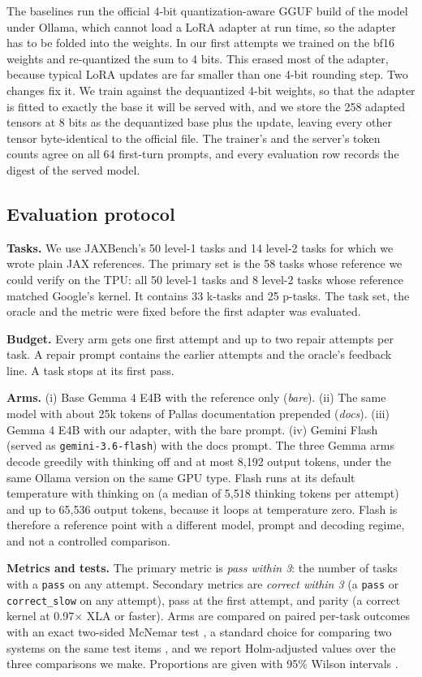 \documentclass[conference]{IEEEtran}
\newcommand{\x}{$\times$}
\begin{document}
The baselines run the official 4-bit quantization-aware GGUF build of the model under Ollama, which cannot load a LoRA adapter
at run time, so the adapter has to be folded into the weights. In our first attempts we trained on the bf16 weights and
re-quantized the sum to 4 bits. This erased most of the adapter, because typical LoRA updates are far smaller than one 4-bit
rounding step. Two changes fix it. We train against the dequantized 4-bit weights, so that the adapter is fitted to exactly the
base it will be served with, and we store the 258 adapted tensors at 8 bits as the dequantized base plus the update, leaving
every other tensor byte-identical to the official file. The trainer's and the server's token counts agree on all 64 first-turn
prompts, and every evaluation row records the digest of the served model.

\subsection{Evaluation protocol}

\textbf{Tasks.} We use JAXBench's 50 level-1 tasks and 14 level-2 tasks for which we wrote plain JAX references. The primary
set is the 58 tasks whose reference we could verify on the TPU: all 50 level-1 tasks and 8 level-2 tasks whose reference
matched Google's kernel. It contains 33 k-tasks and 25 p-tasks. The task set, the oracle and the metric were fixed before the
first adapter was evaluated.

\textbf{Budget.} Every arm gets one first attempt and up to two repair attempts per task. A repair prompt contains the earlier
attempts and the oracle's feedback line. A task stops at its first pass.

\textbf{Arms.} (i) Base Gemma 4 E4B with the reference only (\emph{bare}). (ii) The same model with about 25k tokens of
Pallas documentation prepended (\emph{docs}). (iii) Gemma 4 E4B with our adapter, with the bare prompt. (iv) Gemini Flash
(served as \texttt{gemini-3.6-flash}) with the docs prompt. The three Gemma arms decode greedily with thinking off and at most
8,192 output tokens, under the same Ollama version on the same GPU type. Flash runs at its default temperature with thinking
on (a median of 5,518 thinking tokens per attempt) and up to 65,536 output tokens, because it loops at temperature zero. Flash
is therefore a reference point with a different model, prompt and decoding regime, and not a controlled comparison.

\textbf{Metrics and tests.} The primary metric is \emph{pass within 3}: the number of tasks with a \texttt{pass} on any
attempt. Secondary metrics are \emph{correct within 3} (a \texttt{pass} or \texttt{correct\_slow} on any attempt), pass at the
first attempt, and parity (a correct kernel at 0.97\x{} XLA or faster). Arms are compared on paired per-task outcomes with an
exact two-sided McNemar test \cite{mcnemar}, a standard choice for comparing two systems on the same test items \cite{dietterich}, and we report Holm-adjusted values \cite{holm} over the three comparisons we make.
Proportions are given with 95\% Wilson intervals \cite{wilson}.
\end{document}
